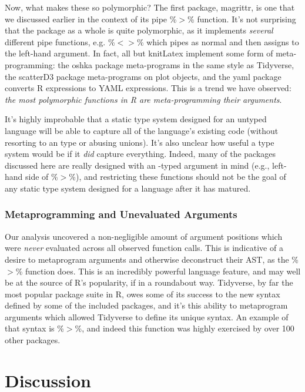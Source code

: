 \documentclass[acmsmall,10pt,review,anonymous]{acmart}\settopmatter{printfolios=true,printccs=false,printacmref=false}
\begin{document}
Now, what makes these so polymorphic?
The first package, magrittr, is one that we discussed earlier in the context of its pipe \%$>$\% function. 
It's not surprising that the package as a whole is quite polymorphic, as it implements {\it several} different pipe functions, e.g. \%$<>$\% which pipes as normal and then assigns to the left-hand argument.
In fact, all but knitLatex implement some form of meta-programming:
the oshka package meta-programs in the same style as Tidyverse, the scatterD3 package meta-programs on plot objects, and the yaml package converts R expressions to YAML expressions.
This is a trend we have observed: {\it the most polymorphic functions in R are meta-programming their arguments}.

It's highly improbable that a static type system designed for an untyped language will be able to capture all of the language's existing code (without resorting to an \ANY type or abusing unions).
It's also unclear how useful a type system would be if it {\it did} capture everything.
Indeed, many of the packages discussed here are really designed with an \ANY-typed argument in mind (e.g., left-hand side of \%$>$\%), and restricting these functions should not be the goal of any static type system designed for a language after it has matured.

%
%
%
%
\subsubsection{Metaprogramming and Unevaluated Arguments}

Our analysis uncovered a non-negligible amount of argument positions which were {\it never} evaluated across all observed function calls.
This is indicative of a desire to metaprogram arguments and otherwise deconstruct their AST, as the \%$>$\% function does.
This is an incredibly powerful language feature, and may well be at the source of R's popularity, if in a roundabout way.
Tidyverse, by far the most popular package suite in R, owes some of its success to the new syntax defined by some of the included packages, and it's this ability to metaprogram arguments which allowed Tidyverse to define its unique syntax.
An example of that syntax is \%$>$\%, and indeed this function was highly exercised by over 100 other packages.

%
%  
%
%
%
%
\section{Discussion}
\end{document}
